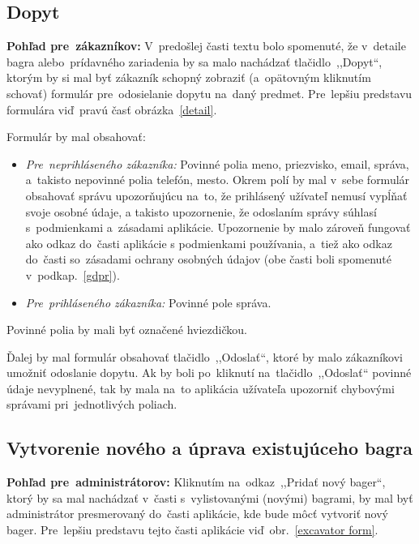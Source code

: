 \subsection{Dopyt}
\label{dopyt}

\textbf{Pohľad pre~zákazníkov:} V~predošlej časti textu bolo spomenuté, že v~detaile bagra alebo~prídavného zariadenia by sa malo nachádzať tlačidlo~,,Dopyt``, ktorým by si mal byť zákazník schopný zobraziť (a~opätovným kliknutím schovať) formulár pre~odosielanie dopytu na~daný predmet. Pre~lepšiu predstavu formulára viď~pravú časť obrázka~\ref{detail}.

Formulár by mal obsahovať:
\begin{itemize}
\item \textit{Pre~neprihláseného zákazníka:}
Povinné polia meno, priezvisko, email, sprá\-va, a~takisto nepovinné polia telefón, mesto. Okrem polí by mal v~sebe formulár obsahovať správu upozorňujúcu na~to, že prihlásený užívateľ nemusí vypĺňať svoje osobné údaje, a takisto upozornenie, že odoslaním správy súhlasí s~podmienkami a~zásadami aplikácie. Upozornenie by malo zároveň fungovať ako odkaz do~časti aplikácie s podmienkami používania, a~tiež ako odkaz do~časti so~zásadami ochrany osobných údajov (obe časti boli spomenuté v~podkap.~\ref{gdpr}).
\item \textit{Pre~prihláseného zákazníka:}
Povinné pole správa.
\end{itemize}
Povinné polia by mali byť označené hviezdičkou.

Ďalej by mal formulár obsahovať tlačidlo~,,Odoslať``, ktoré by malo zákazníkovi umožniť odoslanie dopytu. Ak by boli po~kliknutí na~tlačidlo~,,Odoslať`` povinné údaje nevyplnené, tak by mala na~to aplikácia užívateľa upozorniť chybovými správami pri~jednotlivých poliach.

\subsection{Vytvorenie nového a úprava existujúceho bagra}
\label{vytvorenie noveho a uprava existujuceho bagra}

\textbf{Pohľad pre~administrátorov:} Kliknutím na~odkaz~,,Pridať nový bager``, ktorý by sa mal nachádzať v~časti s~vylistovanými (novými) bagrami, by mal byť administrátor presmerovaný do~časti aplikácie, kde bude môcť vytvoriť nový bager. Pre~lepšiu predstavu tejto časti aplikácie viď~obr.~\ref{excavator form}.

